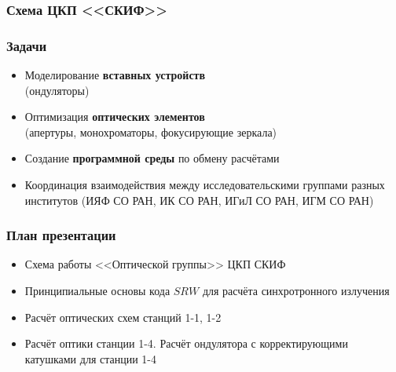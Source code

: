\documentclass[14pt, hyperref = {colorlinks},xcolor=table ]{beamer}
\begin{document}
\small
\begin{frame}
\frametitle{Схема ЦКП <<СКИФ>>}\label{t1}
\vspace{-10pt}
\begin{figure}[h]
\end{figure}
\end{frame}

\small
\begin{frame}
\frametitle{Задачи}\label{t1}
\begin{center}
\begin{itemize}
	\item Моделирование \textbf{вставных устройств} \\(ондуляторы)
  	\item Оптимизация \textbf{оптических элементов} \\(апертуры, монохроматоры, фокусирующие зеркала)
  	\item Создание \textbf{программной среды} по обмену расчётами
	\item Координация взаимодействия между исследовательскими группами разных институтов (ИЯФ СО РАН, ИК СО РАН, ИГиЛ СО РАН, ИГМ СО РАН)
\end{itemize}
\end{center}
\end{frame}



\small
\begin{frame}
\frametitle{План презентации}\label{t1}
\begin{center}
		\begin{itemize}
		\item Схема работы <<Оптической группы>> ЦКП СКИФ
		\item Принципиальные основы кода $SRW$ для расчёта синхротронного излучения
		\item Расчёт оптических схем станций 1-1, 1-2
		\item Расчёт оптики станции 1-4. Расчёт ондулятора с корректирующими катушками для станции 1-4
	\end{itemize}
\end{center}
\end{frame}
\end{document}
